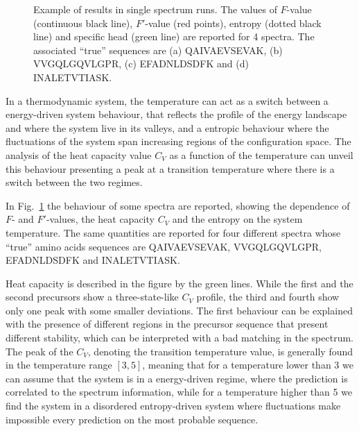 \begin{figure}
{\label{fig:ex4}}
\caption{\label{fig:examples}
Example of results in single spectrum runs. The values of $F$-value (continuous
black line), $F'$-value (red points), entropy (dotted black line) and specific
head (green line) are reported for 4 spectra. The associated ``true'' sequences
are (a) QAIVAEVSEVAK, (b) VVGQLGQVLGPR, (c) EFADNLDSDFK and (d) INALETVTIASK.}
\end{figure}


In a thermodynamic system, the temperature can act as a switch between a
energy-driven system behaviour, that reflects the profile of the energy
landscape and where the system live in its valleys, and a entropic behaviour
where the fluctuations of the system span increasing regions of the configuration
space.
The analysis of the heat capacity value $C_V$ as a function of the temperature
can unveil this behaviour presenting a peak at a transition temperature where there is a switch between the
two regimes.

In Fig.~\ref{fig:examples} the behaviour of some spectra are reported, showing
the dependence of $F$- and $F'$-values, the heat capacity $C_V$ and the entropy
on the system temperature.
The same quantities are reported for four different spectra whose ``true'' 
amino acids sequences are 
QAIVAEVSEVAK, VVGQLGQVLGPR, EFADNLDSDFK and  INALETVTIASK.

Heat capacity is described in the figure by the green lines.
While the first and the second precursors show a three-state-like $C_V$ profile,
the third and fourth show only one peak with some smaller deviations. 
The first behaviour can be explained with the presence of different regions in the precursor
sequence that present different stability, which can be interpreted with a bad matching in the
spectrum.
The peak of the $C_V$, denoting the transition temperature value, is generally
found in the temperature range $[3,5]$, meaning that for a temperature lower
than 3 we can assume that the system is in a energy-driven regime, where the
prediction is correlated to the spectrum information, while for a temperature
higher than 5 we find the system in a disordered entropy-driven system where
fluctuations make impossible every prediction on the most probable sequence.



